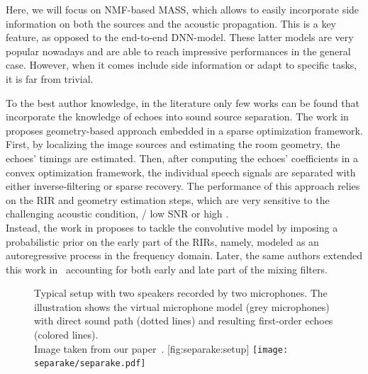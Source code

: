 \mynewline
Here, we will focus on \acf{NMF}-based \ac{MASS}, which allows to easily incorporate side information on both the sources and the acoustic propagation.
This is a key feature, as opposed to the end-to-end \acf{DNN}-model.
These latter models are very popular nowadays and are able to reach impressive performances in the general case.
However, when it comes include side information or adapt to specific tasks, it is far from trivial.

\mynewline
To the best author knowledge, in the literature only few works can be found that incorporate the knowledge of echoes into sound source separation.
The work in~ proposes geometry-based approach embedded in a sparse optimization framework.
First, by localizing the image sources and estimating the room geometry, the echoes' timings are estimated.
Then, after computing the echoes' coefficients in a convex optimization framework, the individual speech signals are separated with either inverse-filtering or sparse recovery.
The performance of this approach relies on the \ac{RIR} and geometry estimation steps, which are very sensitive to the challenging acoustic condition, \eg/ low SNR or high \RT.
\\Instead, the work in  proposes to tackle the convolutive model by imposing a probabilistic prior on the early part of the \acp{RIR}, namely, modeled as an autoregressive process in the frequency domain.
Later, the same authors extended this work in~ accounting for both early and late part of the mixing filters.


\begin{figure}[]
    \begin{sidecaption}{%
        Typical setup with two speakers recorded by two microphones.
        The illustration shows the virtual microphone model (grey microphones) with direct sound path (dotted lines) and resulting first-order echoes (colored lines).
        \\Image taken from our paper~.
        }[fig:separake:setup]
    \centering
    \texttt{[image: separake/separake.pdf]}
    \end{sidecaption}
\end{figure}

